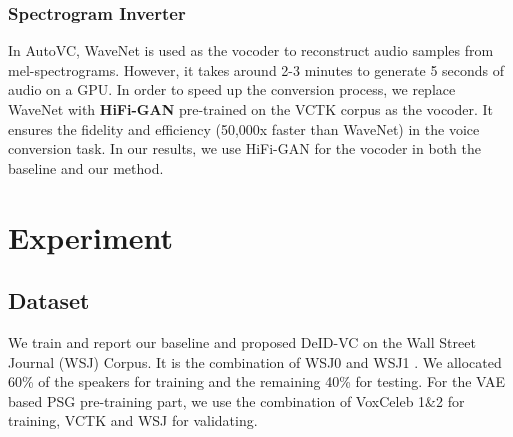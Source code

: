 \documentclass[a4paper]{article}
\begin{document}
\subsubsection{Spectrogram Inverter}
    In AutoVC, WaveNet \cite{oord2016wavenet} is used as the vocoder to reconstruct audio samples from mel-spectrograms. However, it takes around 2-3 minutes to generate 5 seconds of audio on a GPU. %
    In order to speed up the conversion process, we replace WaveNet with \textbf{HiFi-GAN} \cite{hifigan} pre-trained on the VCTK corpus \cite{yamagishi2019cstr} as the vocoder. It ensures the fidelity and efficiency (50,000x faster than WaveNet) in the voice conversion task. In our results, we use HiFi-GAN for the vocoder in both the baseline and our method.

\section{Experiment}
\label{Experiment}

\subsection{Dataset}
    We train and report our baseline and proposed DeID-VC on the Wall Street Journal (WSJ) Corpus. It is the combination of WSJ0 \cite{wsj0} and WSJ1 \cite{wsj1}. We allocated 60\% of the speakers for training and the remaining 40\% for testing. %
    For the VAE based PSG pre-training part, we use the combination of VoxCeleb 1\&2 for training, VCTK and WSJ for validating.
\end{document}
